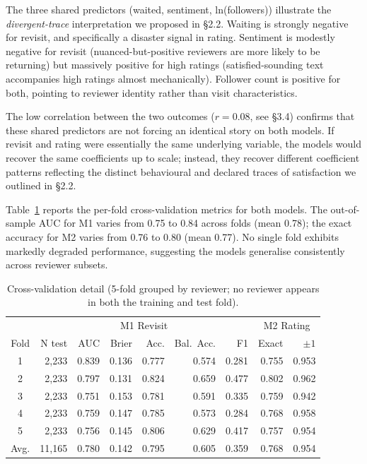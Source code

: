 \documentclass[10pt,a4paper]{article}
\newcommand{\subsect}[1]{\vspace{6pt}\noindent{\large\bfseries #1}\par\vspace{2pt}}
\begin{document}
The three shared predictors (waited, sentiment, ln(followers))
illustrate the \emph{divergent-trace} interpretation we proposed in
\S2.2. Waiting is strongly negative for revisit, and specifically a
disaster signal in rating. Sentiment is modestly negative for revisit
(nuanced-but-positive reviewers are more likely to be returning) but
massively positive for high ratings (satisfied-sounding text accompanies
high ratings almost mechanically). Follower count is positive for both,
pointing to reviewer identity rather than visit characteristics.

The low correlation between the two outcomes ($r = 0.08$, see \S3.4)
confirms that these shared predictors are not forcing an identical story
on both models. If revisit and rating were essentially the same
underlying variable, the models would recover the same coefficients up
to scale; instead, they recover different coefficient patterns reflecting
the distinct behavioural and declared traces of satisfaction we outlined
in \S2.2.

\subsect{4.4 Cross-validation Details}

Table~\ref{tab:cv} reports the per-fold cross-validation metrics for
both models. The out-of-sample AUC for M1 varies from 0.75 to 0.84
across folds (mean 0.78); the exact accuracy for M2 varies from 0.76
to 0.80 (mean 0.77). No single fold exhibits markedly degraded
performance, suggesting the models generalise consistently across
reviewer subsets.

\begin{table}[H]\centering
\caption{Cross-validation detail (5-fold grouped by reviewer; no
reviewer appears in both the training and test fold).}
\label{tab:cv}
\footnotesize
\begin{tabular}{@{}c rrrrrr | rr@{}}
\toprule
     & \multicolumn{6}{c|}{M1 Revisit} & \multicolumn{2}{c}{M2 Rating} \\
Fold & N test  & AUC   & Brier & Acc.  & Bal.~Acc. & F1    & Exact & $\pm 1$ \\
\midrule
1    & 2{,}233 & 0.839 & 0.136 & 0.777 & 0.574     & 0.281 & 0.755 & 0.953 \\
2    & 2{,}233 & 0.797 & 0.131 & 0.824 & 0.659     & 0.477 & 0.802 & 0.962 \\
3    & 2{,}233 & 0.751 & 0.153 & 0.781 & 0.591     & 0.335 & 0.759 & 0.942 \\
4    & 2{,}233 & 0.759 & 0.147 & 0.785 & 0.573     & 0.284 & 0.768 & 0.958 \\
5    & 2{,}233 & 0.756 & 0.145 & 0.806 & 0.629     & 0.417 & 0.757 & 0.954 \\
\midrule
Avg. & 11{,}165 & 0.780 & 0.142 & 0.795 & 0.605 & 0.359 & 0.768 & 0.954 \\
\bottomrule
\end{tabular}
\end{table}
\end{document}
